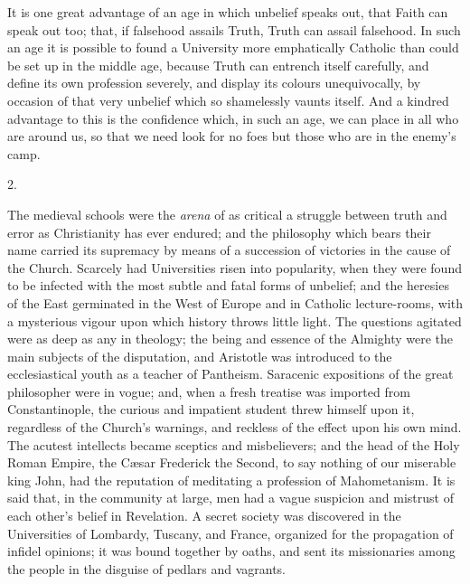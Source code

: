 It is one great advantage of an age in which unbelief speaks out,
that Faith can speak out too; that, if falsehood assails Truth, Truth
can assail falsehood. In such an age it is possible to found a
University more emphatically Catholic than could be set up in the
middle age, because Truth can entrench itself carefully, and define
its own profession severely, and display its colours
unequivocally, by occasion of that very unbelief which so shamelessly
vaunts itself. And a kindred advantage to this is the confidence
which, in such an age, we can place in all who are around us, so that
we need look for no foes but those who are in the enemy's camp.

2.

The medieval schools were the \emph{arena} of as critical a
struggle between truth and error as Christianity has ever endured; and
the philosophy which bears their name carried its supremacy by means
of a succession of victories in the cause of the Church. Scarcely had
Universities risen into popularity, when they were found to be
infected with the most subtle and fatal forms of unbelief; and the
heresies of the East germinated in the West of Europe and in Catholic
lecture-rooms, with a mysterious vigour upon which history throws
little light. The questions agitated were as deep as any in theology;
the being and essence of the Almighty were the main subjects of the
disputation, and Aristotle was introduced to the ecclesiastical youth
as a teacher of Pantheism. Saracenic expositions of the great
philosopher were in vogue; and, when a fresh treatise was imported
from Constantinople, the curious and impatient student threw himself
upon it, regardless of the Church's warnings, and reckless of the
effect upon his own mind. The acutest intellects became sceptics and
misbelievers; and the head of the Holy Roman Empire, the Cæsar
Frederick the Second, to say nothing of our miserable king John, had
the reputation of meditating a profession of Mahometanism. It is said
that, in the community at large, men had a vague suspicion and
mistrust of each other's belief in Revelation. A secret society was
discovered in the Universities of Lombardy, Tuscany, and France,
organized for the propagation of infidel opinions; it was bound
together by oaths, and sent its missionaries among the people in the
disguise of pedlars and vagrants.

